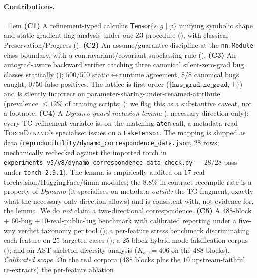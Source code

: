 \paragraph{Contributions.}\hangindent=1em
\textbf{(C1)} A refinement-typed calculus
$\mathsf{Tensor}\{s,g\mid\varphi\}$ unifying symbolic shape and
static gradient-flag analysis under one Z3 procedure
(), with classical
Preservation/Progress ().
\textbf{(C2)} An assume/guarantee discipline at the
\texttt{nn.Module} class boundary, with a contravariant/covariant
subclassing rule ().
\textbf{(C3)} An autograd-aware backward verifier catching
three canonical silent-zero-grad bug classes statically
(); $500/500$ static$\leftrightarrow$runtime
agreement, $8/8$ canonical bugs caught, $0/50$ false positives.
The lattice is first-order
($\{\texttt{has\_grad},\texttt{no\_grad},\top\}$) and is silently
incorrect on parameter-sharing-under-renamed-attribute (prevalence
$\le 12\%$ of training scripts; ); we flag this as
a substantive caveat, not a footnote.
\textbf{(C4)} A \emph{Dynamo-guard inclusion lemma}
(, necessary direction only): every
\textsc{TG} refinement variable is, on the matching
\texttt{aten} call, a metadata read \textsc{TorchDynamo}'s
specialiser issues on a \texttt{FakeTensor}.  The mapping is
shipped as data
(\texttt{reproducibility/dynamo\_correspondence\_data.json},
$28$ rows; mechanically rechecked against the imported
torch in
\texttt{experiments\_v5/v8/dynamo\_correspondence\_data\_check.py}
--- $28/28$ pass under \texttt{torch~2.9.1}).  The lemma is
empirically audited on $17$ real torchvision/HuggingFace/timm
modules; the $8.8\%$ in-contract recompile rate is a property
of \emph{Dynamo} (it specialises on metadata
\emph{outside} the \textsc{TG} fragment, exactly what the
necessary-only direction allows) and is consistent with, not
evidence for, the lemma.  We do \emph{not} claim a
two-directional correspondence.
\textbf{(C5)} A $488$-block + $60$-bug $+\,10$-real-public-bug
benchmark with calibrated reporting under a five-way verdict
taxonomy per tool ();
a per-feature stress benchmark
discriminating each feature on $25$ targeted cases
(); a $25$-block hybrid-mode
falsification corpus (); and an
AST-skeleton diversity analysis
($K_{\mathsf{ast}}{=}406$ on the $488$ blocks). \emph{Calibrated
scope.} On the real corpora ($488$ blocks plus the
$10$ upstream-faithful re-extracts) the per-feature ablation
